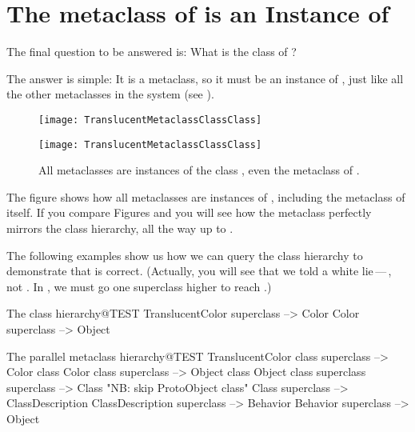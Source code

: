 \documentclass[a4paper,10pt,twoside]{book}
\begin{document}
\section{The metaclass of  is an Instance of }

The final question to be answered is:
What is the class of ?

The answer is simple:
It is a metaclass, so it must be an instance of , just like all the other metaclasses in the system (see ).

\begin{center}
\begin{figure}
\ifluluelse
	{\centerline{\texttt{[image: TranslucentMetaclassClassClass]}}}
	{\centerline{\texttt{[image: TranslucentMetaclassClassClass]}}}
\caption{All metaclasses are instances of the class , even the metaclass of .\label{fig:metaclassclassclass}}
\end{figure}
\end{center}

The figure shows how all metaclasses are instances of , including the metaclass of  itself.
If you compare Figures  and  you will see how the metaclass  perfectly mirrors the class hierarchy, all the way up to .

The following examples show us how we can query the class hierarchy to demonstrate that  is correct.
(Actually, you will see that we told a white lie\,---\,, not .
In \sq, we must go one superclass higher to reach .)

\begin{example}{The class hierarchy}{@TEST}
TranslucentColor superclass --> Color
Color superclass                   --> Object
\end{example}

\begin{example}{The parallel metaclass hierarchy}{@TEST}
TranslucentColor class superclass   --> Color class
Color class superclass                     --> Object class
Object class superclass superclass --> Class    "NB: skip ProtoObject class"
Class superclass                              --> ClassDescription
ClassDescription superclass            --> Behavior
Behavior superclass                         --> Object
\end{example}
\end{document}
